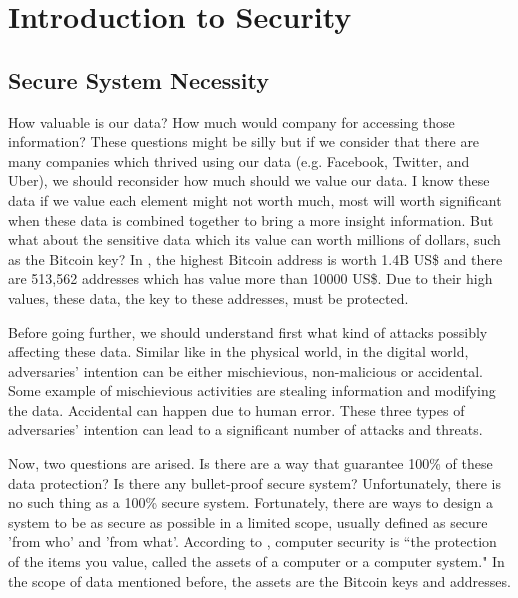 \chapter{Introduction to Security}

\section{Secure System Necessity}
How valuable is our data? How much would company for accessing those information? These questions might be silly but if we consider that there are many companies which thrived using our data (e.g. Facebook, Twitter, and Uber), we should reconsider how much should we value our data. I know these data if we value each element might not worth much, most will worth significant when these data is combined together to bring a more insight information. But what about the sensitive data which its value can worth millions of dollars, such as the Bitcoin key? In \cite{bitcoin}, the highest Bitcoin address is worth 1.4B US\$ and there are 513,562 addresses which has value more than 10000 US\$. Due to their high values, these data, the key to these addresses, must be protected.

Before going further, we should understand first what kind of attacks possibly affecting these data. Similar like in the physical world, in the digital world, adversaries' intention can be either mischievious, non-malicious or accidental. Some example of mischievious activities are stealing information and modifying the data. Accidental can happen due to human error. These three types of adversaries' intention can lead to a significant number of attacks and threats.

Now, two questions are arised. Is there are a way that guarantee 100\% of these data protection? Is there any bullet-proof secure system? Unfortunately, there is no such thing as a 100\% secure system. Fortunately, there are ways to design a system to be as secure as possible in a limited scope, usually defined as secure 'from who' and 'from what'. According to \cite{Pfleeger}, computer security is ``the protection of the items you value, called the assets of a computer or a computer system." In the scope of data mentioned before, the assets are the Bitcoin keys and addresses.


